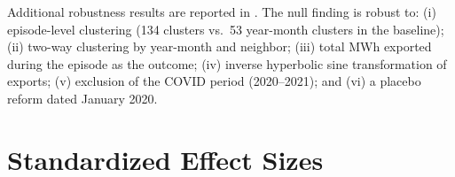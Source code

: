 \documentclass[12pt]{article}
\begin{document}
Additional robustness results are reported in . The null finding is robust to: (i) episode-level clustering (134 clusters vs.\ 53 year-month clusters in the baseline); (ii) two-way clustering by year-month and neighbor; (iii) total MWh exported during the episode as the outcome; (iv) inverse hyperbolic sine transformation of exports; (v) exclusion of the COVID period (2020--2021); and (vi) a placebo reform dated January 2020.

\section{Standardized Effect Sizes}
\label{sec:sde}


\end{document}
